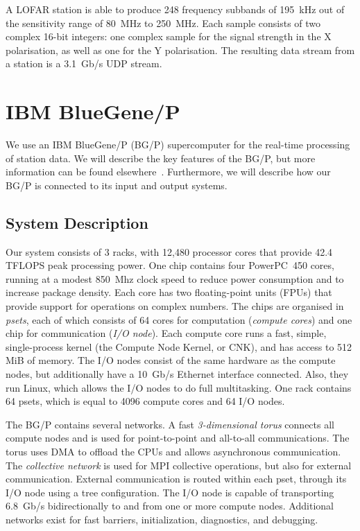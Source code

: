 \documentclass{llncs}
\begin{document}
A LOFAR station is able to produce 248 frequency subbands of 195~kHz out of the sensitivity range of 80~MHz to 250~MHz. Each sample consists of two complex 16-bit integers: one complex sample for the signal strength in the X polarisation, as well as one for the Y polarisation. The resulting data stream from a station is a 3.1~Gb/s UDP stream.


\section{IBM BlueGene/P}

We use an IBM BlueGene/P (BG/P) supercomputer for the real-time processing of station data. We will describe the key features of the BG/P, but more information can be found elsewhere~\cite{IBM:08}. Furthermore, we will describe how our BG/P is connected to its input and output systems.

\subsection{System Description}

Our system consists of 3 racks, with 12,480 processor cores that provide 42.4 TFLOPS peak processing power. One chip contains four PowerPC~450 cores, running at a modest 850~Mhz clock speed to reduce power consumption and to increase package density. Each core has two floating-point units (FPUs) that provide support for operations on complex numbers. The chips are organised in \emph{psets}, each of which consists of 64 cores for computation (\emph{compute cores}) and one chip for communication (\emph{I/O node}). Each compute core runs a fast, simple, single-process kernel (the Compute Node Kernel, or CNK), and has access to 512 MiB of memory. The I/O nodes consist of the same hardware as the compute nodes, but additionally have a 10~Gb/s Ethernet interface connected. Also, they run Linux, which allows the I/O nodes to do full multitasking. One rack contains 64 psets, which is equal to 4096 compute cores and 64 I/O nodes.

The BG/P contains several networks. A fast \emph{3-dimensional torus\/} connects all compute nodes and is used for point-to-point and all-to-all communications. The torus uses DMA to offload the CPUs and allows asynchronous communication. The \emph{collective network\/} is used for MPI collective operations, but also for external communication. External communication is routed within each pset, through its I/O node using a tree configuration. The I/O node is capable of transporting 6.8~Gb/s bidirectionally to and from one or more compute nodes. Additional networks exist for fast barriers, initialization, diagnostics, and debugging. %
\end{document}
